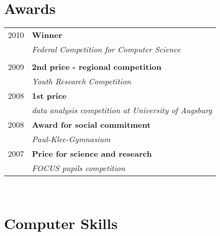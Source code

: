 \documentclass[a4paper,10pt]{article} %
\begin{document}
{\begin{minipage}[t]{0.44\textwidth}

\section{Awards} 

\begin{tabular}{rl}
2010	 & \textbf{Winner}\\
& \textit{Federal Competition for Computer Science}\\ \\


2009	 & \textbf{2nd price - regional competition}\\
& \textit{Youth Research Competition}\\[10pt]


2008	 & \textbf{1st price}\\
& \textit{data analysis competition at University of Augsburg}\\[10pt]


2008	 & \textbf{Award for social commitment}\\
& \textit{Paul-Klee-Gymnasium}
\\[10pt]


2007	 & \textbf{Price for science and research}\\
& \textit{FOCUS pupils competition}
\end{tabular}\\[10pt]


\section{Computer Skills} 


\end{minipage}}
\end{document}
